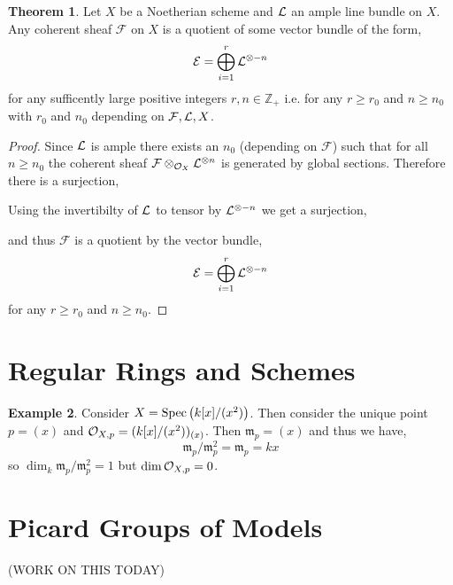\documentclass[12pt]{extarticle}
\newcommand{\Z}{\mathbb{Z}}
\theoremstyle{definition}
\newtheorem{theorem}{Theorem}[section]
\newtheorem{example}[theorem]{Example}
\newcommand{\F}{\mathcal{F}}
\newcommand{\m}{\mathfrak{m}}
\begin{document}
\begin{theorem}
Let $X$ be a Noetherian scheme and $\mathcal{L}$ an ample line bundle on $X$. Any coherent sheaf $\F$ on $X$ is a quotient of some vector bundle of the form,
\[ \mathcal{E} = \bigoplus_{i = 1}^r \mathcal{L}^{\otimes -n} \]
for any sufficently large positive integers $r, n \in \Z_{+}$ i.e. for any $r \ge r_0$ and $n \ge n_0$ with $r_0$ and $n_0$ depending on $\F, \L, X$. 
\end{theorem}

\begin{proof}
Since $\mathcal{L}$ is ample there exists an $n_0$ (depending on $\F$) such that for all $n \ge n_0$ the coherent sheaf $\F \otimes_{\struct{X}} \L^{\otimes n}$ is generated by global sections. Therefore there is a surjection,
\begin{center}
\end{center}
Using the invertibilty of $\mathcal{L}$ to tensor by $\mathcal{L}^{\otimes - n}$ we get a surjection,
\begin{center}
\end{center}
and thus $\F$ is a quotient by the vector bundle,
\[ \mathcal{E} = \bigoplus_{i = 1}^r \mathcal{L}^{\otimes -n} \]
for any $r \ge r_0$ and $n \ge n_0$. 
\end{proof}

\section{Regular Rings and Schemes}

\begin{example}
Consider $X = \mathrm{Spec}\left(k[x]/(x^2)\right)$. Then consider the unique point $p = (x)$ and $\mathcal{O}_{X, p} = (k[x]/(x^2))_{(x)}$. Then $\m_p = (x)$ and thus we have,
\[ \m_p / \m_p^2 = \m_p = k x \]
so $\dim_k \m_p / \m_p^2 = 1$ but $\dim{\mathcal{O}_{X, p}} = 0$. 
\end{example}


\section{Picard Groups of Models}

(WORK ON THIS TODAY)
\end{document}
